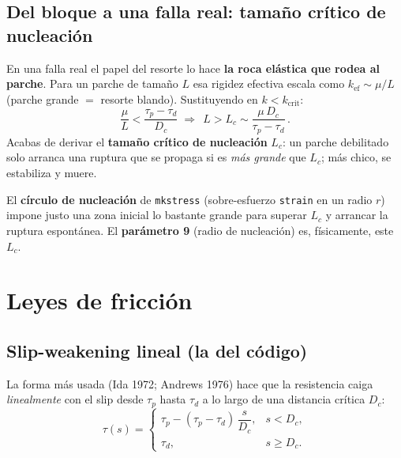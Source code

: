 \documentclass[11pt,a4paper]{article}
\newcommand{\Dc}{D_c}
\newcommand{\taup}{\tau_p}
\newcommand{\taud}{\tau_d}
\begin{document}
\subsection{Del bloque a una falla real: tamaño crítico de nucleación}
En una falla real el papel del resorte lo hace \textbf{la roca elástica que rodea
al parche}. Para un parche de tamaño $L$ esa rigidez efectiva escala como
$k_{\text{ef}}\sim \mu/L$ (parche grande $=$ resorte blando). Sustituyendo en
$k<k_{\mathrm{crit}}$:
\begin{equation}
  \frac{\mu}{L} < \frac{\taup-\taud}{\Dc}
  \;\Longrightarrow\;
  \boxed{\,L > L_c \sim \frac{\mu\,\Dc}{\taup-\taud}\,}.
  \label{eq:Lc}
\end{equation}
Acabas de derivar el \textbf{tamaño crítico de nucleación} $L_c$: un parche
debilitado solo arranca una ruptura que se propaga si es \emph{más grande} que
$L_c$; más chico, se estabiliza y muere.

\begin{codebox}
El \textbf{círculo de nucleación} de \texttt{mkstress} (sobre-esfuerzo
\texttt{strain} en un radio $r$) impone justo una zona inicial lo bastante grande
para superar $L_c$ y arrancar la ruptura espontánea. El \textbf{parámetro 9}
(radio de nucleación) es, físicamente, este $L_c$.
\end{codebox}

\section{Leyes de fricción}

\subsection{Slip-weakening lineal (la del código)}
La forma más usada (Ida 1972; Andrews 1976) hace que la resistencia caiga
\emph{linealmente} con el slip desde $\taup$ hasta $\taud$ a lo largo de una
distancia crítica $\Dc$:
\begin{equation}
  \tau(s)=
  \begin{cases}
    \taup-(\taup-\taud)\,\dfrac{s}{\Dc}, & s<\Dc,\\[8pt]
    \taud, & s\ge \Dc.
  \end{cases}
  \label{eq:sw}
\end{equation}
\end{document}
